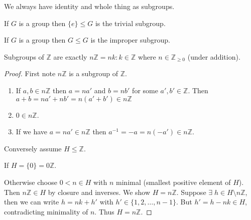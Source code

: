We always have identity and whole thing as subgroups.

\begin{example}
If \(G\) is a group then \(\{ e \} \leq G\) is the trivial subgroup.
\end{example}

\begin{example}
If \(G\) is a group then \(G \leq G\) is the improper subgroup.
\end{example}

\begin{proposition}
\protect\hypertarget{prp:nZ}{}\label{prp:nZ}Subgroups of \(\mathbb{Z}\) are exactly \(n \mathbb{Z} = {nk : k \in \mathbb{Z}}\) where \(n \in \mathbb{Z}_{\geq 0}\) (under addition).
\end{proposition}

\begin{proof}
First note \(n \mathbb{Z}\) is a subgroup of \(\mathbb{Z}\).

\begin{enumerate}
\def\labelenumi{\alph{enumi}.}
\item
  If \(a, b \in n \mathbb{Z}\) then \(a = na'\) and \(b = nb'\) for some \(a', b' \in \mathbb{Z}\).
  Then \(a + b = na' + nb' = n (a' + b') \in n \mathbb{Z}\)
\item
  \(0 \in n \mathbb{Z}\).
\item
  If we have \(a = na' \in n \mathbb{Z}\) then \(a^{-1} = -a = n(-a') \in n \mathbb{Z}\).
\end{enumerate}

Conversely assume \(H \leq \mathbb{Z}\).

If \(H = \{ 0 \} = 0 \mathbb{Z}\).

Otherwise choose \(0 < n \in H\) with \(n\) minimal (smallest positive element of \(H\)).
Then \(n \mathbb{Z} \in H\) by closure and inverses. We show \(H = n \mathbb{Z}\). Suppose \(\exists \; h \in H \setminus n \mathbb{Z}\), then we can write \(h = nk + h'\) with \(h' \in \{ 1, 2, \ldots, n -1 \}\). But \(h' = h - nk \in H\), contradicting minimality of \(n\). Thus \(H = n \mathbb{Z}\).
\end{proof}

